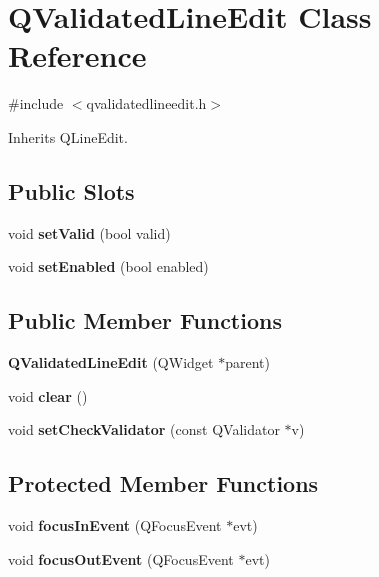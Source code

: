 \hypertarget{class_q_validated_line_edit}{}\section{Q\+Validated\+Line\+Edit Class Reference}
\label{class_q_validated_line_edit}


{\ttfamily \#include $<$qvalidatedlineedit.\+h$>$}



Inherits Q\+Line\+Edit.

\subsection*{Public Slots}
\begin{DoxyCompactItemize}
\item 
\mbox{\label{class_q_validated_line_edit_ad9984e2e463cc7fbf28fe334498a1df5}} 
void {\bfseries set\+Valid} (bool valid)
\item 
\mbox{\label{class_q_validated_line_edit_af0a2d32e9d2fb08c5069852cf4bfc860}} 
void {\bfseries set\+Enabled} (bool enabled)
\end{DoxyCompactItemize}
\subsection*{Public Member Functions}
\begin{DoxyCompactItemize}
\item 
\mbox{\label{class_q_validated_line_edit_a542bbdf8df060026a4b43f76a000193c}} 
{\bfseries Q\+Validated\+Line\+Edit} (Q\+Widget $\ast$parent)
\item 
\mbox{\label{class_q_validated_line_edit_aee2a648f6f4904f21e55871afbddefa9}} 
void {\bfseries clear} ()
\item 
\mbox{\label{class_q_validated_line_edit_af365be1760e17fd1ea6b430fa6005bd2}} 
void {\bfseries set\+Check\+Validator} (const Q\+Validator $\ast$v)
\end{DoxyCompactItemize}
\subsection*{Protected Member Functions}
\begin{DoxyCompactItemize}
\item 
\mbox{\label{class_q_validated_line_edit_a914d4efae9ac7c74faa3a4a82d26fec3}} 
void {\bfseries focus\+In\+Event} (Q\+Focus\+Event $\ast$evt)
\item 
\mbox{\label{class_q_validated_line_edit_a842e76d50efaa98a9eb1fa0343132503}} 
void {\bfseries focus\+Out\+Event} (Q\+Focus\+Event $\ast$evt)
\end{DoxyCompactItemize}



